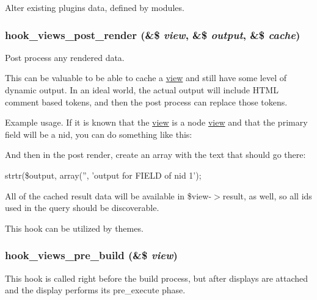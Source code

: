 Alter existing plugins data, defined by modules. \hypertarget{group__views__hooks_g21cc61642e5cafc23ec621f07dae1f4b}{
\subsubsection[{hook\_\-views\_\-post\_\-render}]{\setlength{\rightskip}{0pt plus 5cm}hook\_\-views\_\-post\_\-render (\&\$ {\em view}, \/  \&\$ {\em output}, \/  \&\$ {\em cache})}}
\label{group__views__hooks_g21cc61642e5cafc23ec621f07dae1f4b}


Post process any rendered data.

This can be valuable to be able to cache a \hyperlink{classview}{view} and still have some level of dynamic output. In an ideal world, the actual output will include HTML comment based tokens, and then the post process can replace those tokens.

Example usage. If it is known that the \hyperlink{classview}{view} is a node \hyperlink{classview}{view} and that the primary field will be a nid, you can do something like this:

And then in the post render, create an array with the text that should go there:

strtr(\$output, array('', 'output for FIELD of nid 1');

All of the cached result data will be available in \$view-$>$result, as well, so all ids used in the query should be discoverable.

This hook can be utilized by themes. \hypertarget{group__views__hooks_g1c3fc52e2854310f84eeb43b98a0ba64}{
\subsubsection[{hook\_\-views\_\-pre\_\-build}]{\setlength{\rightskip}{0pt plus 5cm}hook\_\-views\_\-pre\_\-build (\&\$ {\em view})}}
\label{group__views__hooks_g1c3fc52e2854310f84eeb43b98a0ba64}


This hook is called right before the build process, but after displays are attached and the display performs its pre\_\-execute phase.

